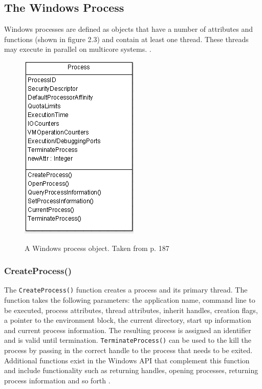 \documentclass[12pt] {newrucsthesis}    %
\def\code#1{\texttt{#1}}
\begin{document}
      \subsection{The Windows Process}
        Windows processes are defined as objects that have a number of attributes and functions
        (shown in figure 2.3) and contain at least one thread. These threads may execute in parallel on
        multicore systems. \citep{OSInternals&DesignPrinciplesStallings}.

        \begin{figure}[H]
        \includegraphics{procObj}
        \label{fig:procObj}
        \caption{A Windows process object. Taken from \cite{OSInternals&DesignPrinciplesStallings} p. 187}
        \end{figure}

        \subsubsection{CreateProcess()}
          The \code{CreateProcess()} function creates a process and its primary thread. The function takes the
          following parameters: the application name, command line to be executed, process attributes, thread attributes,
          inherit handles, creation flags, a pointer to the environment block, the current directory, start up information
          and current process information. The resulting process is assigned an identifier and is
          valid until termination. \code{TerminateProcess()} can be used to the kill the process by
          passing in the correct handle to the process that needs to be exited. Additional functions
          exist in the Windows API that complement this function and include functionality such as returning
          handles, opening processes, returning process information and so forth \citep{MSDN_API}.
\end{document}
